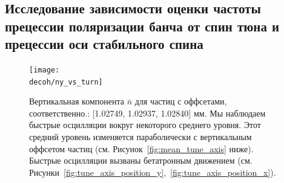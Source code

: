 \documentclass{report}
\newcommand{\home}{/home/alexa}
\newcommand{\Artem}{\home/REPOS/COSYINF/img/Artem}
\newcommand{\decoh}{\Artem/decoherence_frequency_dependence}
\begin{document}
\subsection{Исследование зависимости оценки частоты прецессии поляризации банча от спин тюна и прецессии оси стабильного спина}\label{sec:SpinTune_and_SPA_dependence}

\begin{figure}[H]
  \centering
  \texttt{[image: \\decoh/ny\_vs\_turn]}
  \caption{Вертикальная компонента $\bar n$ для частиц с оффсетами,
    соответственно.: [1.02749, 1.02937, 1.02840] мм. Мы наблюдаем
    быстрые осцилляции вокруг некоторого среднего уровня. Этот средний
    уровень изменяется параболически с вертикальным оффсетом частиц
    (см. Рисунок~\ref{fig:mean_tune_axis} ниже). Быстрые осцилляции
    вызваны бетатронным движением (см. Рисунки~\ref{fig:tune_axis_position_y},~\ref{fig:tune_axis_position_x}).\label{fig:ny_vs_turn}}
\end{figure}
\end{document}
